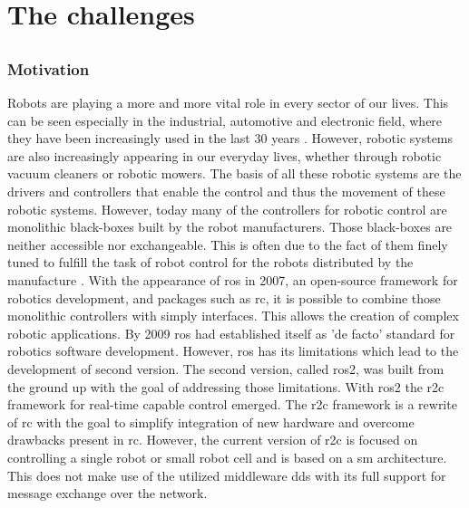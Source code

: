 \part{The challenges}
\chapter{}
\label{sec:Introduction}
\section{Motivation}
Robots are playing a more and more vital role in every sector of our lives. This can be seen especially in the industrial, automotive and electronic field, where they have been increasingly used in the last 30 years \cite{cheng_rise_2019, bilancia_overview_2023}. However, robotic systems are also increasingly appearing in our everyday lives, whether through robotic vacuum cleaners or robotic mowers. The basis of all these robotic systems are the drivers and controllers that enable the control and thus the movement of these robotic systems. However, today many of the controllers for robotic control are monolithic black-boxes built by the robot manufacturers. Those black-boxes are neither accessible nor exchangeable. This is often due to the fact of them finely tuned to fulfill the task of robot control for the robots distributed by the manufacture \cite{puck_distributed_2020, plasberg_towards_2022}. \newline
With the appearance of \gls{ros} in 2007, an open-source framework for robotics development, and packages such as \gls{rc}, it is possible to combine those monolithic controllers with simply interfaces. This allows the creation of complex robotic applications. By 2009 \gls{ros} had established itself as 'de facto' standard for robotics software development. However, \gls{ros} has its limitations which lead to the development of second version. The second version, called \gls{ros2}, was built from the ground up with the goal of addressing those limitations. \newline
With \gls{ros2} the \gls{r2c} framework for real-time capable control emerged. The \gls{r2c} framework is a rewrite of \gls{rc} with the goal to simplify integration of new hardware and overcome drawbacks present in \gls{rc}. However, the current version of \gls{r2c} is focused on controlling a single robot or small robot cell and is based on a \gls{sm} architecture. This does not make use of the utilized middleware \gls{dds} with its full support for message exchange over the network. 

